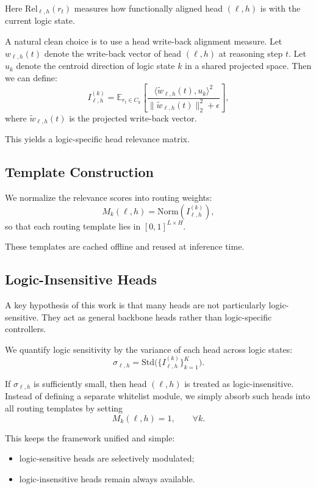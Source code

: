 \documentclass[11pt]{article}
\begin{document}
Here $\mathrm{Rel}_{\ell,h}(r_t)$ measures how functionally aligned head $(\ell,h)$ is with the current logic state.

A natural clean choice is to use a head write-back alignment measure. Let $w_{\ell,h}(t)$ denote the write-back vector of head $(\ell,h)$ at reasoning step $t$. Let $u_k$ denote the centroid direction of logic state $k$ in a shared projected space. Then we can define:
\[
I_{\ell,h}^{(k)}
=
\mathbb{E}_{r_t \in C_k}
\left[
\frac{\langle \tilde{w}_{\ell,h}(t), u_k\rangle^2}{\|\tilde{w}_{\ell,h}(t)\|_2^2+\epsilon}
\right],
\]
where $\tilde{w}_{\ell,h}(t)$ is the projected write-back vector.

This yields a logic-specific head relevance matrix.

\subsection{Template Construction}

We normalize the relevance scores into routing weights:
\[
M_k(\ell,h) = \mathrm{Norm}\!\left(I_{\ell,h}^{(k)}\right),
\]
so that each routing template lies in $[0,1]^{L\times H}$.

These templates are cached offline and reused at inference time.

\subsection{Logic-Insensitive Heads}

A key hypothesis of this work is that many heads are not particularly logic-sensitive. They act as general backbone heads rather than logic-specific controllers.

We quantify logic sensitivity by the variance of each head across logic states:
\[
\sigma_{\ell,h} = \mathrm{Std}\big(\{I_{\ell,h}^{(k)}\}_{k=1}^{K}\big).
\]

If $\sigma_{\ell,h}$ is sufficiently small, then head $(\ell,h)$ is treated as logic-insensitive. Instead of defining a separate whitelist module, we simply absorb such heads into all routing templates by setting
\[
M_k(\ell,h)=1,\qquad \forall k.
\]

This keeps the framework unified and simple:
\begin{itemize}[leftmargin=1.5em]
    \item logic-sensitive heads are selectively modulated;
    \item logic-insensitive heads remain always available.
\end{itemize}
\end{document}
